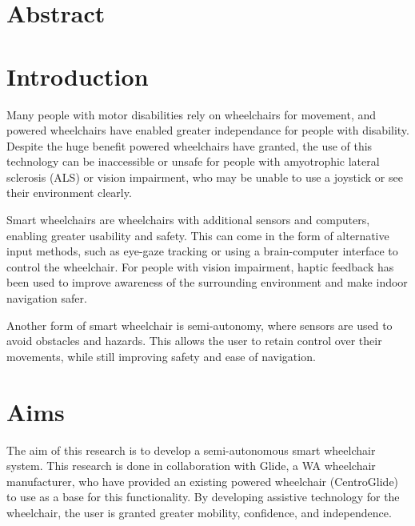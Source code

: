 \documentclass[12pt]{article}
\begin{document}

\thispagestyle{empty}
\pagebreak

\section*{Abstract}
\pagebreak

\renewcommand{\contentsname}{Table of Contents}
\tableofcontents
\listoffigures
\listoftables
\pagebreak

\section{Introduction}
Many people with motor disabilities rely on wheelchairs for movement, and
powered wheelchairs have enabled greater independance for people with disability.
Despite the huge benefit powered wheelchairs have granted,
the use of this technology can be inaccessible or unsafe for people
with amyotrophic lateral sclerosis (ALS) or vision impairment,
who may be unable to use a joystick or see their environment clearly.

Smart wheelchairs are wheelchairs with additional sensors and computers,
enabling greater usability and safety. This can come in the form of alternative input methods,
such as eye-gaze tracking \cite{eidNovelEyeGazeControlledWheelchair2016} or using a brain-computer
interface \cite{kaufmannBraincomputerInterfaceBased2014} to control the wheelchair. For people with vision impairment,
haptic feedback \cite{kondoNavigationGuidanceControl2008}\cite{vanderpoortenPoweredWheelchairNavigation2012}
has been used to improve awareness of the surrounding environment and make indoor navigation safer.

Another form of smart wheelchair is semi-autonomy, where sensors are used to avoid obstacles and
hazards. This allows the user to retain control over their movements, while still improving safety
and ease of navigation.


\pagebreak

\section{Aims}
The aim of this research is to develop a semi-autonomous smart wheelchair system.
This research is done in collaboration with Glide, a WA wheelchair manufacturer,
who have provided an existing powered wheelchair (CentroGlide) to use as a base
for this functionality. By developing assistive technology for the wheelchair,
the user is granted greater mobility, confidence, and independence.
\end{document}
